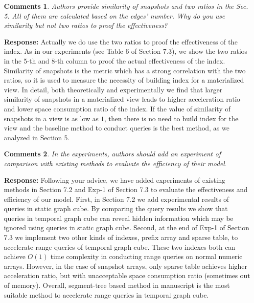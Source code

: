 \documentclass{article}
\newtheorem{Comments}{\textbf{Comments}}
\begin{document}
\begin{Comments}
Authors provide similarity of snapshots and two ratios in the Sec. 5. All of them are calculated based on the edges’ number. Why do you use similarity but not two ratios to proof the effectiveness?
\end{Comments}
\noindent \textbf{Response:} Actually we do use the two ratios to proof the effectiveness of the index. As in our experiments (see Table 6 of Section 7.3), we show the two ratios in the 5-th and 8-th column to proof the actual effectiveness of the index. Similarity of snapshots is the metric which has a strong correlation with the two ratios, so it is used to measure the necessity of building index for a materialized view. In detail, both theoretically and experimentally we find that larger similarity of snapshots in a materialized view leads to higher acceleration ratio and lower space consumption ratio of the index. If the value of similarity of snapshots in a view is as low as $ 1 $, then there is no need to build index for the view and the baseline method to conduct queries is the best method, as we analyzed in Section 5.

\begin{Comments}
In the experiments, authors should add an experiment of comparison with existing methods to evaluate the efficiency of their model.
\end{Comments}
\noindent \textbf{Response:} Following your advice, we have added experiments of existing methods in Section 7.2 and Exp-1 of Section 7.3 to evaluate the effectiveness and efficiency of our model. First, in Section 7.2 we add experimental results of queries in static graph cube. By comparing the query results we show that queries in temporal graph cube can reveal hidden information which may be ignored using queries in static graph cube. Second, at the end of Exp-1 of Section 7.3 we implement two other kinds of indexes, prefix array and sparse table, to accelerate range queries of temporal graph cube. These two indexes both can achieve $ O(1) $ time complexity in conducting range queries on normal numeric arrays. However, in the case of snapshot arrays, only sparse table achieves higher acceleration ratio, but with unacceptable space consumption ratio (sometimes out of memory). Overall, segment-tree based method in manuscript is the most suitable method to accelerate range queries in temporal graph cube.
\end{document}
